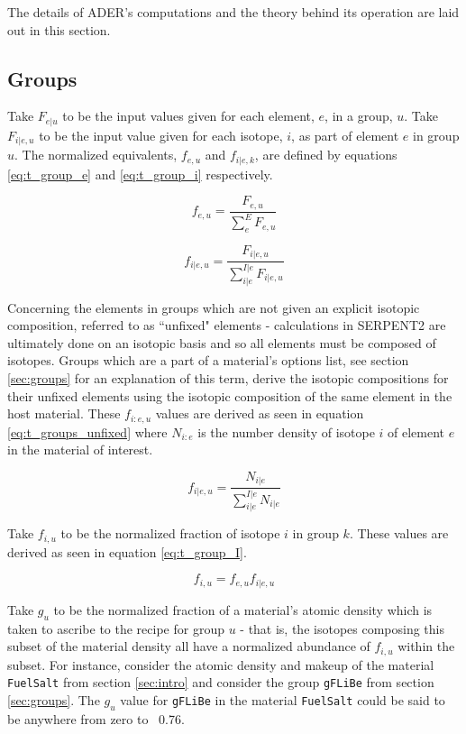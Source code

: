 The details of ADER's computations and the theory behind its operation are
laid out in this section.

\subsection{Groups}\label{theory_groups}
Take $F_{e|u}$ to be the input values given for each element, $e$, in a group,
$u$. Take $F_{i|e,u}$ to be the input value given for each isotope, $i$, as
part of element $e$ in group $u$. The normalized equivalents, $f_{e,u}$ and
$f_{i|e,k}$, are defined by equations \ref{eq:t_group_e} and \ref{eq:t_group_i}
respectively. 

\begin{equation}\label{eq:t_group_e}
f_{e,u} = \frac{F_{e,u}}{\sum_{e}^{E} F_{e,u}}
\end{equation}

\begin{equation}\label{eq:t_group_i}
f_{i|e,u} = \frac{F_{i|e,u}}{\sum_{i|e}^{I|e} F_{i|e,u}}
\end{equation}

Concerning the elements in groups which are not given an explicit isotopic
composition, referred to as ``unfixed" elements - calculations in SERPENT2 are 
ultimately done on an isotopic basis
and so all elements must be composed of isotopes. Groups which are a part of a
material's options list, see section \ref{sec:groups} for an explanation of this
term, derive the isotopic compositions for their unfixed elements using the 
isotopic composition of the same element in the host material. These
$f_{i:e,u}$ values are derived as seen in equation \ref{eq:t_groups_unfixed}
where $N_{i:e}$ is the number density of isotope $i$ of element $e$ in the 
material of interest.

\begin{equation}\label{eq:t_groups_unfixed}
f_{i|e,u} = \frac{N_{i|e}}{\sum_{i|e}^{I|e} N_{i|e}}
\end{equation}

Take $f_{i,u}$ to be the normalized fraction of isotope $i$ in group $k$. These
values are derived as seen in equation \ref{eq:t_group_I}.

\begin{equation}\label{eq:t_group_I}
f_{i,u} = f_{e,u}f_{i|e,u}
\end{equation}

Take $g_{u}$ to be the normalized fraction of a material's atomic density
which is taken to ascribe to the recipe for group $u$ - that is, the isotopes
composing this subset of the material density all have a normalized abundance of
$f_{i,u}$ within the subset. For instance, consider the atomic density and 
makeup of the material \texttt{FuelSalt} from section \ref{sec:intro} and
consider the group \texttt{gFLiBe} from section \ref{sec:groups}. The $g_{u}$
value for \texttt{gFLiBe} in the material \texttt{FuelSalt} could be said
to be anywhere from zero to ~0.76.

